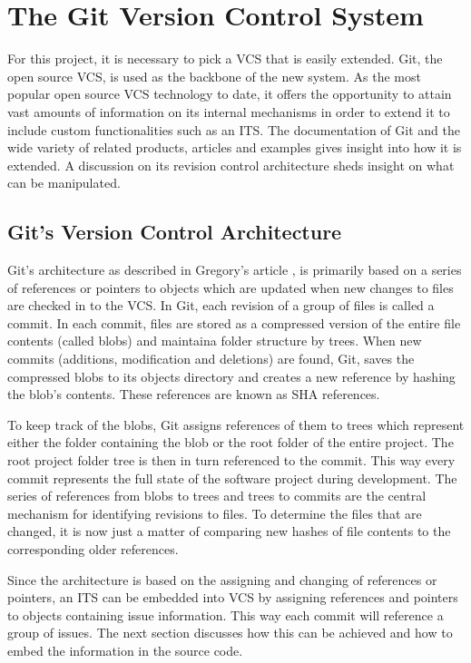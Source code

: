 \documentclass{mproj}
\begin{document}
\section{The Git Version Control System}

For this project, it is necessary to pick a VCS that is easily extended. Git, the open source VCS, is used as the backbone of the new system. As the most popular open source VCS technology to date, it offers the opportunity to attain vast amounts of information on its internal mechanisms in order to extend it to include custom functionalities such as an ITS. The documentation of Git and the wide variety of related products, articles and examples gives insight into how it is extended. A discussion on its revision control architecture sheds insight on what can be manipulated.


\subsection{Git's Version Control Architecture}

Git’s architecture as described in Gregory's article \cite{BehindGit}, is primarily based on a series of references or pointers to objects which are updated when new changes to files are checked in to the VCS. In Git, each revision of a group of files is called a commit. In each commit, files are stored as a compressed version of the entire file contents (called blobs) and maintaina folder structure by trees. When new commits (additions, modification and deletions) are found, Git, saves the compressed blobs to its objects directory and creates a new reference by hashing the blob’s contents. These references are known as SHA references.

To keep track of the blobs, Git assigns references of them to trees which represent either the folder containing the blob or the root folder of the entire project. The root project folder tree is then in turn referenced to the commit. This way every commit represents the full state of the software project during development. The series of references from blobs to trees and trees to commits are the central mechanism for identifying revisions to files. To determine the files that are changed, it is now just a matter of comparing new hashes of file contents to the corresponding older references.

Since the architecture is based on the assigning and changing of references or pointers, an ITS can be embedded into VCS by assigning references and pointers to objects containing issue information. This way each commit will reference a group of issues. The next section discusses how this can be achieved and how to embed the information in the source code.
\end{document}
